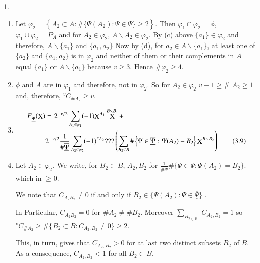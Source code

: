 \documentclass[a4paper,12pt]{article}
\DeclareMathOperator{\x}{\mathrm{X}}
\theoremstyle{definition}
\theoremstyle{underlinethm}
\theoremstyle{definition}
\newtheorem{subsubsec}{}[subsection]
\begin{document}
\begin{subsubsec}
\begin{enumerate}[label=(\alph*)]
\item Let $\varphi_{2} = \left\{A_{2} \subset A : \# \{\Psi (A_{2}) : \Psi \in \underline{\overline{\Psi}}\} \geq 2\right\}$. Then $\varphi_{1} \cap \varphi_{2} = \phi$, $\varphi_{1} \cup \varphi_{2} = P_{A}$ and for $A_{2} \in \varphi_{2}$, $A \smallsetminus A_{2} \in \varphi_{2}$. By (c) above $\{a_{1}\} \in \varphi_{2}$ and therefore, $A\smallsetminus \{a_{1}\}$ and $\{a_{1}, a_{2}\}$ Now by (d), for $a_{2}\in A\smallsetminus\{a_{1}\}$, at least one of $\{a_{2}\}$
and $\{a_{1}, a_{2}\}$ is in $\varphi_{2}$ and neither of them or their complements in $A$ equal $\{a_{1}\}$ or $A\smallsetminus\{a_{1}\}$ because $v\geq 3$. Hence $\# \varphi_{2}\geq 4$.

\item $\phi$ and $A$ are in $\varphi_{1}$ and therefore, not in $\varphi_{2}$. So for $A_{2} \in \varphi_{2}$ $v-1 \geq \#$ $A_{2}\geq 1$ and, therefore, $^{v}C_{\# A_{2}} \geq v$.

\item 
\begin{align*}
F_{\underline{\overline{\Psi}}}(\bold{\x}) &= 2^{-v/2} \sum_{A_{1} \in \varphi_{1}}(-1)  \bold{\x}^{A_{1}} \x^{B\smallsetminus B_{1}} + \\
   & 2^{-v/2} \frac{1}{\# \underline{\overline{\Psi}}} \sum_{A_{2} \in \varphi_{2}} (-1)^{\# A_{2}} ??? \left(\sum_{B_{2} \in B} \# \left\{\Psi \in \underline{\overline{\Psi}} : \Psi(A_{2}) - B_{2}\right\}\bold{\x}^{B\smallsetminus B_{2}}\right)\tag{3.9}
\end{align*}

\item Let $A_{2} \in \varphi_{2}$. We write, for $B_{2} \subset B$, $A_{2}, B_{2}$ for $\frac{1}{\#\underline{\overline{\Psi}}} \# \{\Psi \in \underline{\overline{\Psi}} : \Psi (A_{2}) = B_{2} \}$. which in $\geq 0$.

We note that $C_{A_{2}B_{2}} \neq 0$ if and only if $B_{2} \in \{ \Psi (A_{2}) : \Psi \in \underline{\overline{\Psi}}\}$ .

In Particular, $C_{A_{2}B_{2}} = 0$ for $\# A_{2} \neq \# B_{2}$. Moreover $\sum_{B_{2 \subset B}}$ $C_{A_{2}, B_{2}} =1$ so $^{v}C_{\# A_{2}} \geq \# \{B_{2} \subset B : C_{A_{2}, B_{2}} \neq 0 \} \geq 2$.

This, in turn, gives that $C_{A_{2}, B_{2}}>0$ for at last two distinct subsets $B_{2}$ of $B$. As a consequence, $C_{A_{2}, B_{2}} < 1$ for all $B_{2} \subset B$.


\end{enumerate}
\end{subsubsec}
\end{document}
